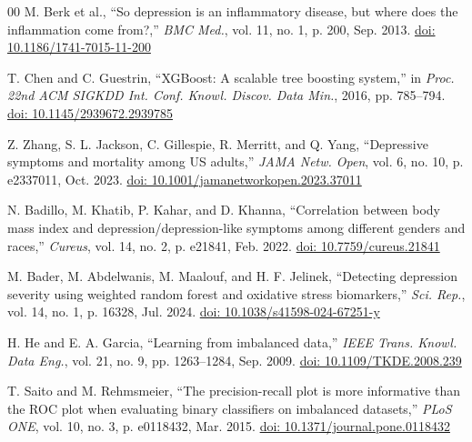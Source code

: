 \documentclass[conference]{IEEEtran}
\begin{document}
\begin{thebibliography}{00}
 M. Berk et al., ``So depression is an inflammatory disease, but where does the inflammation come from?,'' \textit{BMC Med.}, vol. 11, no. 1, p. 200, Sep. 2013. \href{https://doi.org/10.1186/1741-7015-11-200}{doi: 10.1186/1741-7015-11-200}

 T. Chen and C. Guestrin, ``XGBoost: A scalable tree boosting system,'' in \textit{Proc. 22nd ACM SIGKDD Int. Conf. Knowl. Discov. Data Min.}, 2016, pp. 785--794. \href{https://doi.org/10.1145/2939672.2939785}{doi: 10.1145/2939672.2939785}

 Z. Zhang, S. L. Jackson, C. Gillespie, R. Merritt, and Q. Yang, ``Depressive symptoms and mortality among US adults,'' \textit{JAMA Netw. Open}, vol. 6, no. 10, p. e2337011, Oct. 2023. \href{https://doi.org/10.1001/jamanetworkopen.2023.37011}{doi: 10.1001/jamanetworkopen.2023.37011}

 N. Badillo, M. Khatib, P. Kahar, and D. Khanna, ``Correlation between body mass index and depression/depression-like symptoms among different genders and races,'' \textit{Cureus}, vol. 14, no. 2, p. e21841, Feb. 2022. \href{https://doi.org/10.7759/cureus.21841}{doi: 10.7759/cureus.21841}

 M. Bader, M. Abdelwanis, M. Maalouf, and H. F. Jelinek, ``Detecting depression severity using weighted random forest and oxidative stress biomarkers,'' \textit{Sci. Rep.}, vol. 14, no. 1, p. 16328, Jul. 2024. \href{https://doi.org/10.1038/s41598-024-67251-y}{doi: 10.1038/s41598-024-67251-y}

 H. He and E. A. Garcia, ``Learning from imbalanced data,'' \textit{IEEE Trans. Knowl. Data Eng.}, vol. 21, no. 9, pp. 1263--1284, Sep. 2009. \href{https://doi.org/10.1109/TKDE.2008.239}{doi: 10.1109/TKDE.2008.239}

 T. Saito and M. Rehmsmeier, ``The precision-recall plot is more informative than the ROC plot when evaluating binary classifiers on imbalanced datasets,'' \textit{PLoS ONE}, vol. 10, no. 3, p. e0118432, Mar. 2015. \href{https://doi.org/10.1371/journal.pone.0118432}{doi: 10.1371/journal.pone.0118432}
\end{thebibliography}
\end{document}
